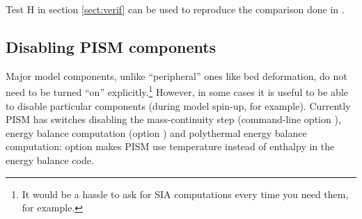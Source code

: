 Test H in section \ref{sect:verif} can be used to reproduce the comparison done in \cite{BLKfastearth}.

\subsection{Disabling PISM components}
\label{sec:turning-off}

Major model components, unlike ``peripheral'' ones like bed deformation, do not need to be turned ``on'' explicitly.\footnote{It would be a hassle to ask for SIA computations every time you need them, for example.} However, in some cases it is useful to be able to disable particular components (during model spin-up, for example). Currently PISM has switches disabling the mass-continuity step (command-line option ), energy balance computation (option ) and polythermal energy balance computation: option  makes PISM use temperature instead of enthalpy in the energy balance code.


